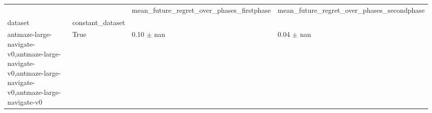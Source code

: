 \begin{tabular}{llll}
\toprule
 &  & mean_future_regret_over_phases_firstphase & mean_future_regret_over_phases_secondphase \\
dataset & constant_dataset &  &  \\
\midrule
antmaze-large-navigate-v0,antmaze-large-navigate-v0,antmaze-large-navigate-v0,antmaze-large-navigate-v0 & True & 0.10 $\pm$ nan & 0.04 $\pm$ nan \\
\cline{1-4}
\bottomrule
\end{tabular}
